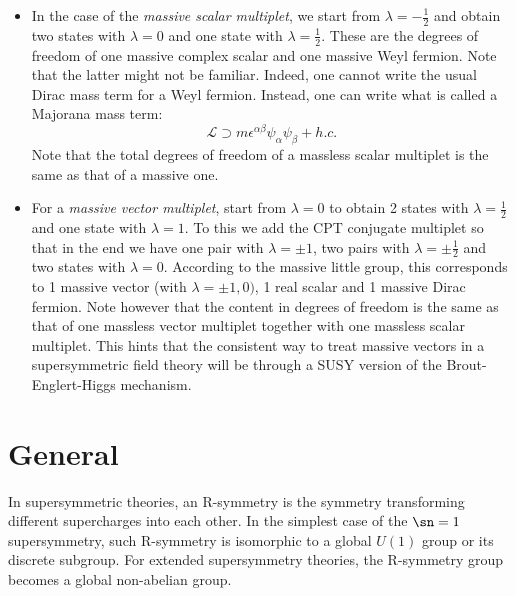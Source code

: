 \begin{example}
  \mbox{}
  \begin{itemize}
    \item In the case of the \textit{massive scalar multiplet}, we start from
      $\lambda =  -\frac{1}{2}$ and obtain two states with $\lambda=0$ and one
      state with $\lambda=\frac{1}{2}$. These are the degrees of freedom of one
      massive complex scalar and one massive Weyl fermion. Note that the latter
      might not be familiar. Indeed, one cannot write the usual Dirac mass term
      for a Weyl fermion. Instead, one can write what is called a Majorana mass
      term:
      \begin{equation}
        \mathcal{L}\supset m\epsilon^{\alpha\beta}\psi_\alpha\psi_\beta + h.c.
      \end{equation}
      Note that the total degrees of freedom of a massless scalar multiplet is
      the same as that of a massive one.
    \item For a \textit{massive vector multiplet}, start from $\lambda = 0$ to
      obtain 2 states with $\lambda = \frac{1}{2}$ and one state with $\lambda
      = 1$. To this we add the CPT conjugate multiplet so that in the end we
      have one pair with $\lambda = \pm1$, two pairs with
      $\lambda=\pm\frac{1}{2}$ and two states with $\lambda = 0$. According to
      the massive little group, this corresponds to 1 massive vector (with
      $\lambda = \pm1,0)$, 1 real scalar and 1 massive Dirac fermion. Note
      however that the content in degrees of freedom is the same as that of one
      massless vector multiplet together with one massless scalar multiplet.
      This hints that the consistent way to treat massive vectors in
      a supersymmetric field theory will be through a SUSY version of the
      Brout-Englert-Higgs mechanism.
    \end{itemize}

  \end{example}
\section{General}
\begin{definition}[R-symmetry]
In supersymmetric theories, an R-symmetry is the symmetry transforming
different supercharges into each other. In the simplest case of the $\sn=1$
supersymmetry, such R-symmetry is isomorphic to a global $U(1)$ group or its discrete subgroup. For extended supersymmetry theories, the R-symmetry group becomes a global non-abelian group.  
\end{definition}

